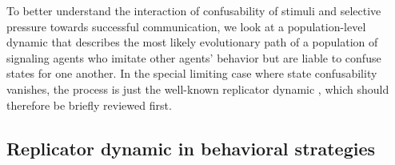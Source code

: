 \documentclass[fleqn,reqno,10pt]{article}
\begin{document}
To better understand the interaction of confusability of stimuli and selective pressure towards
successful communication, we look at a population-level dynamic that describes the most likely
evolutionary path of a population of signaling agents who imitate other agents' behavior but
are liable to confuse states for one another. In the special limiting case where state
confusability vanishes, the process is just the well-known replicator dynamic
\citep{TaylorJonker1978:Evolutionary-St}, which should therefore be briefly reviewed first.


\subsection{Replicator dynamic in behavioral strategies}
\label{sec:repl-dynam-behav}
\end{document}

